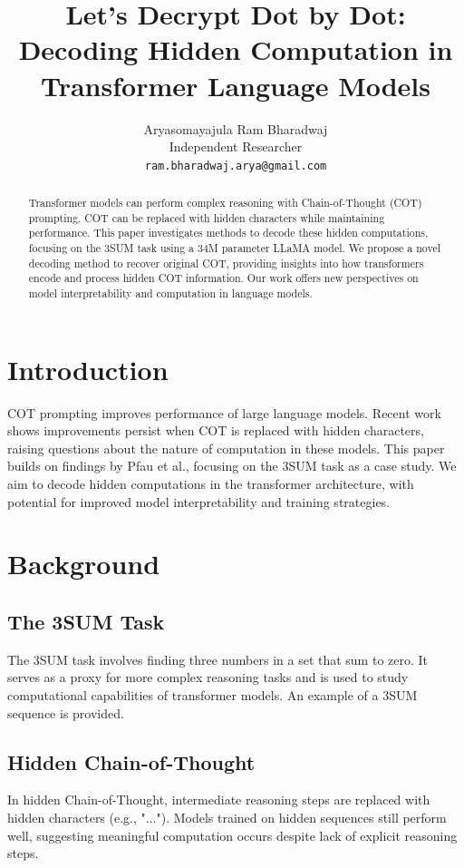 \documentclass[10pt,a4paper]{article}
\title{Let's Decrypt Dot by Dot: Decoding Hidden Computation in Transformer Language Models}
\author{Aryasomayajula Ram Bharadwaj\\
Independent Researcher\\
\texttt{ram.bharadwaj.arya@gmail.com}}
\begin{document}
\maketitle

\begin{abstract}
Transformer models can perform complex reasoning with Chain-of-Thought (COT) prompting. COT can be replaced with hidden characters while maintaining performance. This paper investigates methods to decode these hidden computations, focusing on the 3SUM task using a 34M parameter LLaMA model. We propose a novel decoding method to recover original COT, providing insights into how transformers encode and process hidden COT information. Our work offers new perspectives on model interpretability and computation in language models.
\end{abstract}

\section{Introduction}
COT prompting improves performance of large language models. Recent work shows improvements persist when COT is replaced with hidden characters, raising questions about the nature of computation in these models. This paper builds on findings by Pfau et al., focusing on the 3SUM task as a case study. We aim to decode hidden computations in the transformer architecture, with potential for improved model interpretability and training strategies.

\section{Background}

\subsection{The 3SUM Task}
The 3SUM task involves finding three numbers in a set that sum to zero. It serves as a proxy for more complex reasoning tasks and is used to study computational capabilities of transformer models. An example of a 3SUM sequence is provided.

\subsection{Hidden Chain-of-Thought}
In hidden Chain-of-Thought, intermediate reasoning steps are replaced with hidden characters (e.g., "..."). Models trained on hidden sequences still perform well, suggesting meaningful computation occurs despite lack of explicit reasoning steps.
\end{document}
